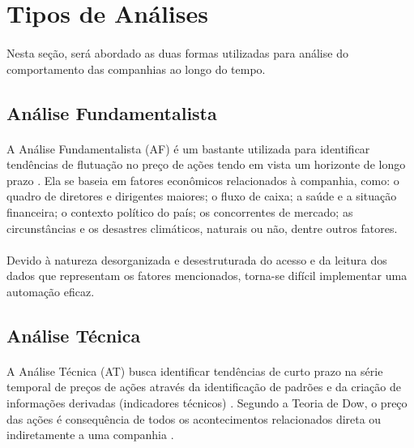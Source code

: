 \FloatBarrier
\section{Tipos de Análises}

\paragraph{} Nesta seção, será abordado as duas formas utilizadas para análise do comportamento das companhias ao longo do tempo.



\FloatBarrier
\subsection{Análise Fundamentalista}
\label{subsection:af}

\paragraph{} A Análise Fundamentalista (AF) é um bastante utilizada para identificar tendências de flutuação no preço de ações tendo em vista um horizonte de longo prazo \cite{bulkowski2012fundamental}. Ela se baseia em fatores econômicos relacionados à companhia, como: o quadro de diretores e dirigentes maiores; o fluxo de caixa; a saúde e a situação financeira; o contexto político do país; os concorrentes de mercado; as circunstâncias e os desastres climáticos, naturais ou não, dentre outros fatores.

\paragraph{} Devido à natureza desorganizada e desestruturada do acesso e da leitura dos dados que representam os fatores mencionados, torna-se difícil implementar uma automação eficaz.



\FloatBarrier
\subsection{Análise Técnica}
\label{subsection:at}

\paragraph{} A Análise Técnica (AT) busca identificar tendências de curto prazo na série temporal de preços de ações através da identificação de padrões e da criação de informações derivadas (indicadores técnicos) \cite{murphy1999technical, edwards2018technical}. Segundo a Teoria de Dow, o preço das ações é consequência de todos os acontecimentos relacionados direta ou indiretamente a uma companhia \cite{kirkpatrick2010technical}.

